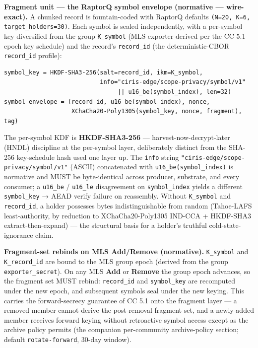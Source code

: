 \documentclass[11pt]{article}
\begin{document}
\textbf{Fragment unit — the RaptorQ symbol envelope (normative — wire-exact).} A chunked record is fountain-coded with RaptorQ defaults \texttt{(N=20, K=6, target\_holders=30)}. Each symbol is sealed independently, with a per-symbol key diversified from the group \texttt{K\_symbol} (MLS exporter-derived per the CC 5.1 epoch key schedule) and the record's \texttt{record\_id} (the deterministic-CBOR \texttt{record\_id} profile):


\begin{lstlisting}
symbol_key = HKDF-SHA3-256(salt=record_id, ikm=K_symbol,
                           info="ciris-edge/scope-privacy/symbol/v1"
                                || u16_be(symbol_index), len=32)
symbol_envelope = (record_id, u16_be(symbol_index), nonce,
                   XChaCha20-Poly1305(symbol_key, nonce, fragment), tag)
\end{lstlisting}

The per-symbol KDF is \textbf{HKDF-SHA3-256} — harvest-now-decrypt-later (HNDL) discipline at the per-symbol layer, deliberately distinct from the SHA-256 key-schedule hash used one layer up. The \texttt{info} string \texttt{"ciris-edge/scope-privacy/symbol/v1"} (ASCII) concatenated with \texttt{u16\_be(symbol\_index)} is normative and MUST be byte-identical across producer, substrate, and every consumer; a \texttt{u16\_be} / \texttt{u16\_le} disagreement on \texttt{symbol\_index} yields a different \texttt{symbol\_key} → AEAD verify failure on reassembly. Without \texttt{K\_symbol} and \texttt{record\_id}, a holder possesses bytes indistinguishable from random (Tahoe-LAFS least-authority, by reduction to XChaCha20-Poly1305 IND-CCA + HKDF-SHA3 extract-then-expand) — the structural basis for a holder's truthful cold-state-ignorance claim.


\textbf{Fragment-set rebinds on MLS Add/Remove (normative).} \texttt{K\_symbol} and \texttt{K\_record\_id} are bound to the MLS group epoch (derived from the group \texttt{exporter\_secret}). On any MLS \textbf{Add} or \textbf{Remove} the group epoch advances, so the fragment set MUST rebind: \texttt{record\_id} and \texttt{symbol\_key} are recomputed under the new epoch, and subsequent symbols seal under the new keying. This carries the forward-secrecy guarantee of CC 5.1 onto the fragment layer — a removed member cannot derive the post-removal fragment set, and a newly-added member receives forward keying without retroactive symbol access except as the archive policy permits (the companion per-community archive-policy section; default \texttt{rotate-forward}, 30-day window).
\end{document}
